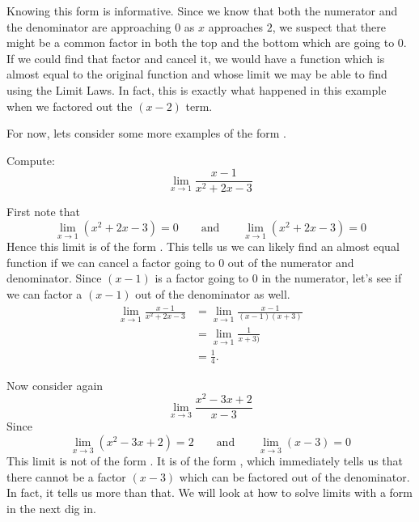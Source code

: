 \documentclass{ximera}
\begin{document}
Knowing this form is informative.  Since we know that both the
numerator and the denominator are approaching $0$ as $x$ approaches
$2$, we suspect that there might be a common factor in both the top
and the bottom which are going to $0$.  If we could find that factor
and cancel it, we would have a function which is almost equal to the
original function and whose limit we may be able to find using the
Limit Laws.  In fact, this is exactly what happened in this example
when we factored out the $(x-2)$ term.

For now, lets consider some more examples of the form \zeroOverZero.

\begin{example}
  Compute:
  \[
  \lim_{x\to1}\frac{x-1}{x^2+2x-3}
  \]
  \begin{explanation}
    First note that
    \[
    \lim_{x\to1}\left(x^2+2x-3\right)=0 \qquad\text{and}\qquad  \lim_{x\to1}\left(x^2+2x-3\right) = 0
    \]
    Hence this limit is of the form \zeroOverZero.  This tells us we
    can likely find an almost equal function if we can cancel a factor
    going to $0$ out of the numerator and denominator.  Since $(x-1)$
    is a factor going to $0$ in the numerator, let's see if we can
    factor a $(x-1)$ out of the denominator as well.
    \begin{align*}
      \lim_{x\to1}\frac{x-1}{x^2+2x-3}&=\lim_{x\to1}\frac{x-1}{(x-1)(x+3)} \\
      &=\lim_{x\to1}\frac{1}{x+3)}\\
      &=\frac{1}{4}.
    \end{align*}
  \end{explanation}
\end{example}

Now consider again
\[
\lim_{x\to 3}\frac{x^2-3x+2}{x-3} 
\]
Since
\[
\lim_{x\to3}\left(x^2-3x+2\right) = 2 \qquad\text{and}\qquad  \lim_{x\to3}\left(x-3\right) = 0
\]
This limit is not of the form \zeroOverZero. It is of the form
\numOverZero, which immediately tells us that there cannot be a factor
$(x-3)$ which can be factored out of the denominator.  In fact, it
tells us more than that.  We will look at how to solve limits with a
form \numOverZero in the next dig in.


\end{document}
